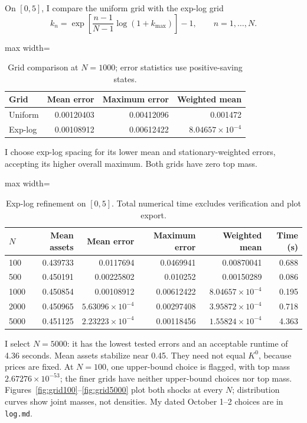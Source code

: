 \documentclass[10pt]{article}
\begin{document}
On $[0,5]$, I compare the uniform grid with the exp-log grid
\[
k_n=\exp\!\left[\frac{n-1}{N-1}\log(1+k_{\max})\right]-1,
\qquad n=1,\ldots,N.
\]
\begin{table}[H]\centering\small
\caption{Grid comparison at $N=1000$; error statistics use positive-saving states.}\label{tab:grids}
\begin{adjustbox}{max width=\linewidth}
\begin{tabular}{lrrr}
\toprule
Grid & Mean error & Maximum error & Weighted mean \\
\midrule
Uniform & 0.00120403 & 0.00412096 & 0.001472 \\
Exp-log & 0.00108912 & 0.00612422 & $8.04657\times10^{-4}$ \\
\bottomrule
\end{tabular}
\end{adjustbox}\end{table}
I choose exp-log spacing for its lower mean and stationary-weighted errors,
accepting its higher overall maximum. Both grids have zero top mass.
\begin{table}[H]\centering\small
\caption{Exp-log refinement on $[0,5]$. Total numerical time excludes verification and plot export.}\label{tab:nodes}
\begin{adjustbox}{max width=\linewidth}
\begin{tabular}{lrrrrr}
\toprule
$N$ & Mean assets & Mean error & Maximum error & Weighted mean & Time (s) \\
\midrule
100 & 0.439733 & 0.0117694 & 0.0469941 & 0.00870041 & 0.688 \\
500 & 0.450191 & 0.00225802 & 0.010252 & 0.00150289 & 0.086 \\
1000 & 0.450854 & 0.00108912 & 0.00612422 & $8.04657\times10^{-4}$ & 0.195 \\
2000 & 0.450965 & $5.63096\times10^{-4}$ & 0.00297408 & $3.95872\times10^{-4}$ & 0.718 \\
5000 & 0.451125 & $2.23223\times10^{-4}$ & 0.00118456 & $1.55824\times10^{-4}$ & 4.363 \\
\bottomrule
\end{tabular}
\end{adjustbox}\end{table}
I select $N=5000$: it has the lowest tested errors and an acceptable runtime of
4.36 seconds. Mean assets stabilize near 0.45. They need not equal $K^0$, because
prices are fixed. At $N=100$, one upper-bound choice is flagged, with top mass
$2.67276\times10^{-53}$; the finer grids have neither upper-bound choices nor top
mass. Figures~\ref{fig:grid100}--\ref{fig:grid5000} plot both shocks at every $N$; distribution curves
show joint masses, not densities. My dated October 1--2 choices are in \texttt{log.md}.
\end{document}
